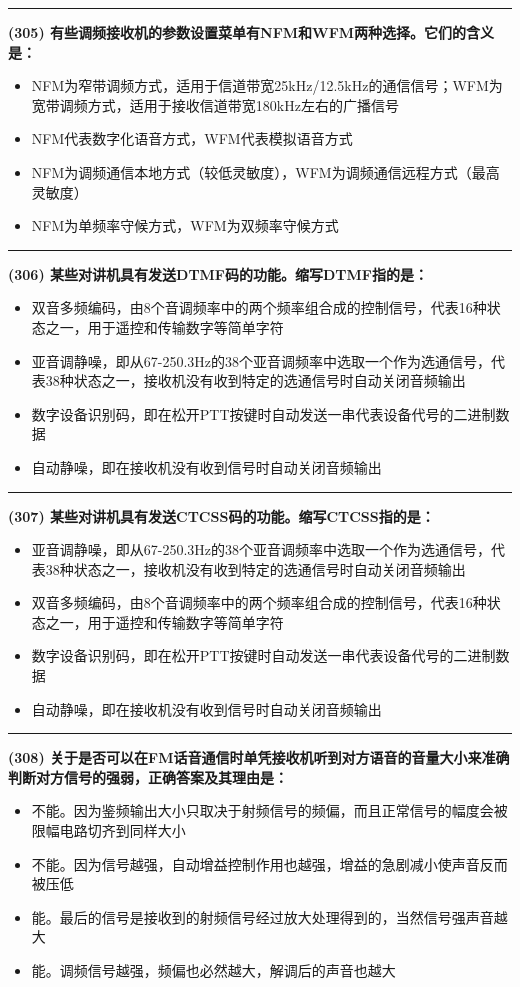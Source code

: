 \documentclass[twocolumn]{ctexart}  %
\begin{document}
\noindent\rule{0.5\textwidth}{1pt}
\heiti \textbf{(305) 有些调频接收机的参数设置菜单有NFM和WFM两种选择。它们的含义是：} \songti {\color{gray} [LK0260] }
\begin{itemize}
	\item  NFM为窄带调频方式，适用于信道带宽25kHz/12.5kHz的通信信号；WFM为宽带调频方式，适用于接收信道带宽180kHz左右的广播信号
	\item  NFM代表数字化语音方式，WFM代表模拟语音方式
	\item  NFM为调频通信本地方式（较低灵敏度），WFM为调频通信远程方式（最高灵敏度）
	\item  NFM为单频率守候方式，WFM为双频率守候方式
\end{itemize}


\noindent\rule{0.5\textwidth}{1pt}
\heiti \textbf{(306) 某些对讲机具有发送DTMF码的功能。缩写DTMF指的是：} \songti {\color{gray} [LK0261] }
\begin{itemize}
	\item  双音多频编码，由8个音调频率中的两个频率组合成的控制信号，代表16种状态之一，用于遥控和传输数字等简单字符
	\item  亚音调静噪，即从67-250.3Hz的38个亚音调频率中选取一个作为选通信号，代表38种状态之一，接收机没有收到特定的选通信号时自动关闭音频输出
	\item  数字设备识别码，即在松开PTT按键时自动发送一串代表设备代号的二进制数据
	\item  自动静噪，即在接收机没有收到信号时自动关闭音频输出
\end{itemize}


\noindent\rule{0.5\textwidth}{1pt}
\heiti \textbf{(307) 某些对讲机具有发送CTCSS码的功能。缩写CTCSS指的是：} \songti {\color{gray} [LK0262] }
\begin{itemize}
	\item  亚音调静噪，即从67-250.3Hz的38个亚音调频率中选取一个作为选通信号，代表38种状态之一，接收机没有收到特定的选通信号时自动关闭音频输出
	\item  双音多频编码，由8个音调频率中的两个频率组合成的控制信号，代表16种状态之一，用于遥控和传输数字等简单字符
	\item  数字设备识别码，即在松开PTT按键时自动发送一串代表设备代号的二进制数据
	\item  自动静噪，即在接收机没有收到信号时自动关闭音频输出
\end{itemize}


\noindent\rule{0.5\textwidth}{1pt}
\heiti \textbf{(308) 关于是否可以在FM话音通信时单凭接收机听到对方语音的音量大小来准确判断对方信号的强弱，正确答案及其理由是：} \songti {\color{gray} [LK0783] }
\begin{itemize}
	\item  不能。因为鉴频输出大小只取决于射频信号的频偏，而且正常信号的幅度会被限幅电路切齐到同样大小
	\item  不能。因为信号越强，自动增益控制作用也越强，增益的急剧减小使声音反而被压低
	\item  能。最后的信号是接收到的射频信号经过放大处理得到的，当然信号强声音越大
	\item  能。调频信号越强，频偏也必然越大，解调后的声音也越大
\end{itemize}
\end{document}
